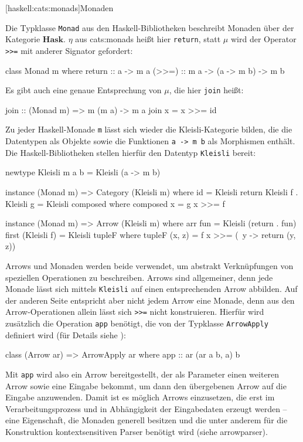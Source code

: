 \documentclass[12pt, a4paper, bibgerm]{scrbook}
\newenvironment{DIFnomarkup}{}{}
\newcommand\icode[1]{\lstinline?#1?}
\newcommand\lsubsection{}
\newcommand\cref{}
\newcommand\sref{}
\newcommand{\seec}[1]{(siehe \cref{#1})}
\begin{document}
\lsubsection[haskell:cats:monads]{Monaden}

Die Typklasse \icode{Monad} aus den Haskell-Bibliotheken beschreibt
Monaden über der Kategorie $\mathbf{Hask}$. $\eta$ aus
\sref{cats:monads} heißt hier \icode{return}, statt $\mu$ wird der
Operator \icode{>>=} %
mit anderer Signator gefordert:
\begin{DIFnomarkup}\begin{code}
class Monad m where
  return :: a -> m a
  (>>=)  :: m a -> (a -> m b) -> m b
\end{code}\end{DIFnomarkup} %
Es gibt auch eine genaue Entsprechung von $\mu$, die hier \icode{join}
heißt:
\begin{DIFnomarkup}\begin{code}
join :: (Monad m) => m (m a) -> m a
join x = x >>= id
\end{code}\end{DIFnomarkup} %

Zu jeder Haskell-Monade \icode{m} lässt sich wieder die
Kleisli-Kategorie bilden, die die Datentypen als Objekte sowie die
Funktionen \icode{a -> m b} als Morphismen enthält. Die
Haskell-Bibliotheken stellen hierfür den Datentyp \icode{Kleisli}
bereit:
\begin{DIFnomarkup}\begin{code}
newtype Kleisli m a b = Kleisli (a -> m b)

instance (Monad m) => Category (Kleisli m)
  where id = Kleisli return
        Kleisli f . Kleisli g = Kleisli composed
          where composed x = g x >>= f

instance (Monad m) => Arrow (Kleisli m)
  where arr fun = Kleisli (return . fun)
        first (Kleisli f) = Kleisli tupleF
          where tupleF (x, z) = f x >>= (\ y -> return (y, z))
\end{code}\end{DIFnomarkup} %

Arrows und Monaden werden beide verwendet, um abstrakt Verknüpfungen von
speziellen Operationen zu beschreiben. Arrows sind allgemeiner, denn
jede Monade lässt sich mittels \icode{Kleisli} auf einen
entsprechenden Arrow abbilden. Auf der anderen Seite entspricht aber
nicht jedem Arrow eine Monade, denn aus den Arrow-Operationen allein
lässt sich \icode{>>=} %
nicht konstruieren. Hierfür wird zusätzlich die Operation \icode{app}
benötigt, die von der Typklasse \icode{ArrowApply} definiert wird (für
Details siehe \cite[S. 18f]{Hughes}):
\begin{DIFnomarkup}\begin{code}
class (Arrow ar) => ArrowApply ar where
  app :: ar (ar a b, a) b
\end{code}\end{DIFnomarkup}
Mit \icode{app} wird also ein Arrow bereitgestellt, der als Parameter
einen weiteren Arrow sowie eine Eingabe bekommt, um dann den übergebenen
Arrow auf die Eingabe anzuwenden. Damit ist es möglich Arrows
einzusetzen, die erst im Verarbeitungsprozess und in Abhängigkeit der
Eingabedaten erzeugt werden -- eine Eigenschaft, die Monaden generell
besitzen und die unter anderem für die Konstruktion kontextsensitiven Parser
benötigt wird \seec{arrowparser}.
\end{document}
